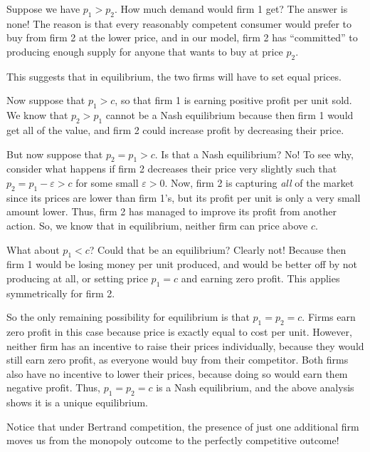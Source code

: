 Suppose we have $p_1 > p_2$. How much demand would firm 1 get? The answer is none! The reason is that every reasonably competent consumer would prefer to buy from firm 2 at the lower price, and in our model, firm 2 has ``committed'' to producing enough supply for anyone that wants to buy at price $p_2$.

This suggests that in equilibrium, the two firms will have to set equal prices. 

Now suppose that $p_1 > c$, so that firm 1 is earning positive profit per unit sold. We know that $p_2 > p_1$ cannot be a Nash equilibrium because then firm 1 would get all of the value, and firm 2 could increase profit by decreasing their price. 

But now suppose that $p_2 = p_1 > c$. Is that a Nash equilibrium? No! To see why, consider what happens if firm 2 decreases their price very slightly such that $p_2 = p_1 - \varepsilon > c$ for some small $\varepsilon > 0$. Now, firm 2 is capturing \emph{all} of the market since its prices are lower than firm 1's, but its profit per unit is only a very small amount lower. Thus, firm 2 has managed to improve its profit from another action. So, we know that in equilibrium, neither firm can price above $c$.

What about $p_1 < c$? Could that be an equilibrium? Clearly not! Because then firm 1 would be losing money per unit produced, and would be better off by not producing at all, or setting price $p_1 = c$ and earning zero profit. This applies symmetrically for firm 2.

So the only remaining possibility for equilibrium is that $p_1 = p_2 = c$. Firms earn zero profit in this case because price is exactly equal to cost per unit. However, neither firm has an incentive to raise their prices individually, because they would still earn zero profit, as everyone would buy from their competitor. Both firms also have no incentive to lower their prices, because doing so would earn them negative profit. Thus, $p_1 = p_2 = c$ is a Nash equilibrium, and the above analysis shows it is a unique equilibrium.

Notice that under Bertrand competition, the presence of just one additional firm moves us from the monopoly outcome to the perfectly competitive outcome! 


